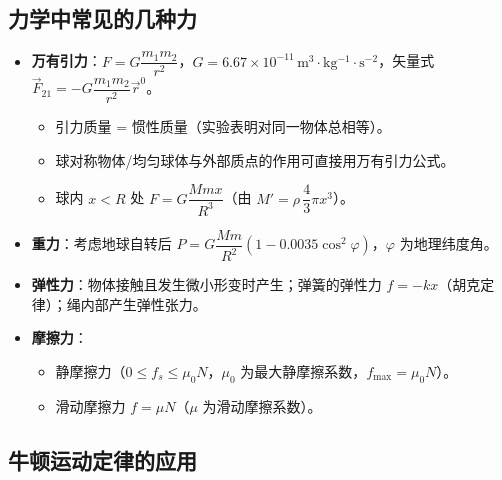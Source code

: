 \documentclass[12pt,a4paper]{ctexart}
\begin{document}
\subsection{力学中常见的几种力}

\begin{itemize}
    \item \textbf{万有引力}：$F = G\dfrac{m_1 m_2}{r^2}$，$G = 6.67\times10^{-11}\,\mathrm{m^3\cdot kg^{-1}\cdot s^{-2}}$，矢量式 $\vec{F}_{21} = -G\dfrac{m_1 m_2}{r^2}\vec{r}^0$。
    \begin{itemize}
        \item 引力质量 = 惯性质量（实验表明对同一物体总相等）。
        \item 球对称物体/均匀球体与外部质点的作用可直接用万有引力公式。
        \item 球内 $x<R$ 处 $F = G\dfrac{Mm x}{R^3}$（由 $M' = \rho\,\dfrac{4}{3}\pi x^3$）。
    \end{itemize}
    \item \textbf{重力}：考虑地球自转后 $P = G\dfrac{Mm}{R^2}(1 - 0.0035\cos^2\varphi)$，$\varphi$ 为地理纬度角。
    \item \textbf{弹性力}：物体接触且发生微小形变时产生；弹簧的弹性力 $f = -kx$（胡克定律）；绳内部产生弹性张力。
    \item \textbf{摩擦力}：
    \begin{itemize}
        \item 静摩擦力（$0 \le f_s \le \mu_0 N$，$\mu_0$ 为最大静摩擦系数，$f_{\max} = \mu_0 N$）。
        \item 滑动摩擦力 $f = \mu N$（$\mu$ 为滑动摩擦系数）。
    \end{itemize}
\end{itemize}

\subsection{牛顿运动定律的应用}
\end{document}

